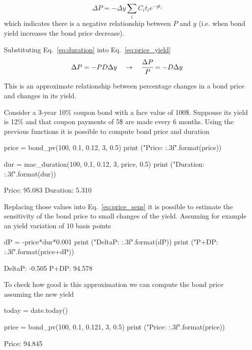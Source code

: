 \begin{equation}
\Delta P = -\Delta y\sum_i C_i t_i e^{-yt_i}
\label{eq:price_yield}
\end{equation}
\noindent
which indicates there is a negative relationship between $P$ and $y$ (i.e. when bond yield increases the bond price decrease). 

Substituting Eq.~\ref{eq:duration} into Eq.~\ref{eq:price_yield} 
\begin{equation}
\Delta P = -PD\Delta y \quad\rightarrow\quad \cfrac{\Delta P}{P} = -D\Delta y
\label{eq:price_sens}
\end{equation}

This is an approximate relationship between percentage changes in a bond price and changes in its yield.

Consider a 3-year 10\% coupon bond with a face value of 100\$. Suppouse its yield is 12\% and that coupon payments of 5\$ are made every 6 months. Using the previous functions it is possible to compute bond price and duration

\begin{ipython}
price = bond_pv(100, 0.1, 0.12, 3, 0.5)
print ("Price: {:.3f}".format(price))

dur = mac_duration(100, 0.1, 0.12, 3, price, 0.5)
print ("Duration: {:.3f}".format(dur))
\end{ipython}
\begin{ioutput}
Price: 95.083
Duration: 5.310
\end{ioutput}

Replacing those values into Eq.~\ref{eq:price_sens} it is possible to estimate the sensitivity of the bond price to small changes of the yield.
Assuming for example an yield variation of 10 basis points
\begin{ipython}
dP = -price*dur*0.001
print ("DeltaP: {:.3f}".format(dP))
print ("P+DP: {:.3f}".format(price+dP))
\end{ipython}
\begin{ioutput}
DeltaP: -0.505
P+DP: 94.578
\end{ioutput}

To check how good is this approximation we can compute the bond price assuming the new yield
\begin{ipython}
today = date.today()

price = bond_pv(100, 0.1, 0.121, 3, 0.5)
print ("Price: {:.3f}".format(price))
\end{ipython}
\begin{ioutput}
Price: 94.845
\end{ioutput}

